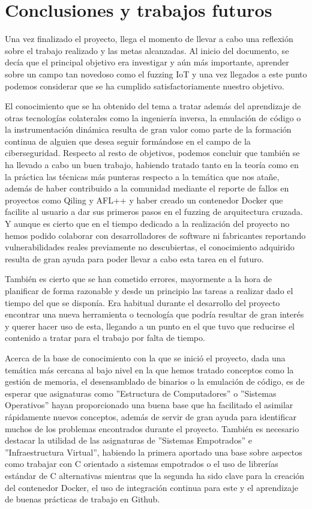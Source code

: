\chapter{Conclusiones y trabajos futuros}
\label{conclusiones}
Una vez finalizado el proyecto, llega el momento de llevar a cabo una reflexión sobre el trabajo realizado y las metas alcanzadas. Al 
inicio del documento, se decía que el principal objetivo era investigar y aún más importante, aprender sobre un campo tan novedoso como 
el fuzzing IoT y una vez llegados a este punto podemos considerar que se ha cumplido satisfactoriamente nuestro objetivo.\bigskip

El conocimiento 
que se ha obtenido del tema a tratar además del aprendizaje de otras tecnologías colaterales como la ingeniería inversa, la 
emulación de código o la instrumentación dinámica resulta de gran valor como parte de la formación continua de alguien que desea seguir 
formándose en el campo de la ciberseguridad. Respecto al resto de objetivos, podemos concluir que también se ha llevado a cabo un buen
trabajo, habiendo tratado tanto en la teoría como en la práctica las técnicas más punteras respecto a la temática que nos atañe, 
además de haber contribuido a la comunidad mediante el reporte de fallos en proyectos como Qiling y AFL++ y haber creado un contenedor 
Docker que facilite al usuario a dar sus primeros pasos en el fuzzing de arquitectura cruzada. Y aunque es cierto que en el tiempo dedicado
a la realización del proyecto no hemos podido colaborar con desarrolladores de software ni fabricantes reportando vulnerabilidades reales 
previamente no descubiertas, el conocimiento adquirido resulta de gran ayuda para poder llevar a cabo esta tarea en el futuro.\bigskip

También es cierto que se han cometido errores, mayormente a la hora de planificar de forma razonable y desde un principio las tareas a
realizar dado el tiempo del que se disponía. Era habitual durante el desarrollo del proyecto encontrar una nueva herramienta o tecnología que podría 
resultar de gran interés y querer hacer uso de esta, llegando a un punto en el que tuvo que reducirse el contenido a tratar para el trabajo
por falta de tiempo.\bigskip

Acerca de la base de conocimiento con la que se inició el proyecto, dada una temática más cercana al bajo nivel en la que hemos tratado conceptos como la gestión de memoria, el desensamblado
de binarios o la emulación de código, es de esperar que asignaturas como ''Estructura de Computadores'' o ''Sistemas Operativos'' hayan proporcionado una buena base 
que ha facilitado el asimilar rápidamente nuevos conceptos, además de servir de gran ayuda para identificar muchos de los problemas 
encontrados durante el proyecto. También es necesario destacar la utilidad de las asignaturas de ''Sistemas Empotrados'' e
''Infraestructura Virtual'', habiendo la primera aportado una base sobre aspectos como trabajar con C orientado a sistemas empotrados o 
el uso de librerías estándar de C alternativas mientras que la segunda ha sido clave para la creación del contenedor Docker, el uso de 
integración continua para este y el aprendizaje de buenas prácticas de trabajo en Github.\bigskip

